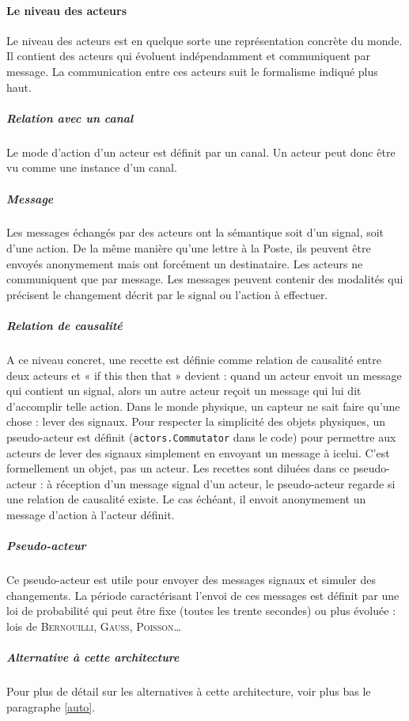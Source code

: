 \documentclass[11pt]{article}
\begin{document}
\paragraph{Le niveau des acteurs} Le niveau des acteurs est en quelque sorte une représentation concrète du monde. Il contient des acteurs qui évoluent indépendamment et communiquent par message. La communication entre ces acteurs suit le formalisme indiqué plus haut.

\subparagraph{Relation avec un canal} Le mode d'action d'un acteur est définit par un canal. Un acteur peut donc être vu comme une instance d'un canal.

\subparagraph{Message} Les messages échangés par des acteurs ont la sémantique soit d'un signal, soit d'une action. De la même manière qu'une lettre à la Poste, ils peuvent être envoyés anonymement mais ont forcément un destinataire. Les acteurs ne communiquent que par message. Les messages peuvent contenir des modalités qui précisent le changement décrit par le signal ou l'action à effectuer.

\subparagraph{Relation de causalité} A ce niveau concret, une recette est définie comme relation de causalité entre deux acteurs et « if this then that » devient : quand un acteur envoit un message qui contient un signal, alors un autre acteur reçoit un message qui lui dit d'accomplir telle action. Dans le monde physique, un capteur ne sait faire qu'une chose : lever des signaux. Pour respecter la simplicité des objets physiques, un pseudo-acteur est définit (\texttt{actors.Commutator} dans le code) pour permettre aux acteurs de lever des signaux simplement en envoyant un message à icelui. C'est formellement un objet, pas un acteur. Les recettes sont \og diluées \fg{} dans ce pseudo-acteur : à réception d'un message signal d'un acteur, le pseudo-acteur regarde si une relation de causalité existe. Le cas échéant, il envoit anonymement un message d'action à l'acteur définit.

\subparagraph{Pseudo-acteur} Ce pseudo-acteur est utile pour envoyer des messages signaux et simuler des changements. La période caractérisant l'envoi de ces messages est définit par une loi de probabilité qui peut être fixe (toutes les trente secondes) ou plus évoluée : lois de \textsc{Bernouilli}, \textsc{Gauss}, \textsc{Poisson}\dots

\subparagraph{Alternative à cette architecture} Pour plus de détail sur les alternatives à cette architecture, voir plus bas le paragraphe \ref{auto}.
\end{document}
